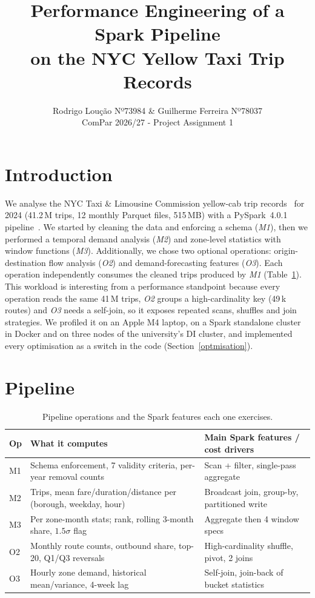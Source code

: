 \documentclass[10pt,a4paper]{article}
\title{\vspace{-1.6cm}Performance Engineering of a Spark Pipeline\\on the NYC Yellow Taxi Trip Records}
\author{Rodrigo Loução Nº73984 \& Guilherme Ferreira Nº78037 \\
  \small ComPar 2026/27 - Project Assignment 1}
\date{\vspace{-0.9cm}}
\begin{document}
\maketitle

\section{Introduction}

We analyse the NYC Taxi \& Limousine Commission yellow-cab trip records~\cite{tlc} for 2024 (41.2\,M trips, 12 monthly Parquet files, 515\,MB) with a PySpark~4.0.1 pipeline~\cite{spark-sql}. We started by cleaning the data and enforcing a schema (\textit{M1}), then we performed a temporal demand analysis (\textit{M2}) and zone-level statistics with window functions (\textit{M3}). Additionally, we chose two optional operations: origin-destination flow analysis (\textit{O2}) and demand-forecasting features (\textit{O3}). Each operation independently consumes the cleaned trips produced by \textit{M1} (Table~\ref{tab:ops}). This workload is interesting from a performance standpoint because every operation reads the same 41\,M trips, \textit{O2} groups a high-cardinality key (49\,k routes) and \textit{O3} needs a self-join, so it exposes repeated scans, shuffles and join strategies. We profiled it on an Apple M4 laptop, on a Spark standalone cluster in Docker and on three nodes of the university's DI cluster, and implemented every optimisation as a switch in the code (Section~\ref{optmisation}).

\section{Pipeline}

\begin{table}[!htb]
\centering\footnotesize
\caption{Pipeline operations and the Spark features each one exercises.}
\label{tab:ops}
\begin{tabular}{@{}lll@{}}
\toprule
Op & What it computes & Main Spark features / cost drivers \\
\midrule
M1 & Schema enforcement, 7 validity criteria, per-year removal counts & Scan + filter, single-pass aggregate \\
M2 & Trips, mean fare/duration/distance per (borough, weekday, hour) & Broadcast join, group-by, partitioned write \\
M3 & Per zone-month stats; rank, rolling 3-month share, $1.5\sigma$ flag & Aggregate then 4 window specs \\
O2 & Monthly route counts, outbound share, top-20, Q1/Q3 reversals & High-cardinality shuffle, pivot, 2 joins \\
O3 & Hourly zone demand, historical mean/variance, 4-week lag & Self-join, join-back of bucket statistics \\
\bottomrule
\end{tabular}
\end{table}
\end{document}
